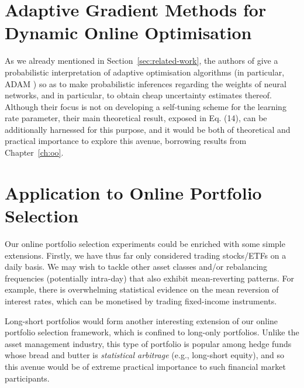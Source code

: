 \section{Adaptive Gradient Methods for Dynamic Online Optimisation}
\label{sec:oo-further-work}

\begin{mccorrection}
As we already mentioned in Section~\ref{sec:related-work}, the authors of \citep{badam} give a probabilistic interpretation of adaptive optimisation algorithms (in particular, ADAM \citep{adam}) so as to make probabilistic inferences regarding the weights of neural networks, and in particular, to obtain cheap uncertainty estimates thereof. Although their focus is not on developing a self-tuning scheme for the learning rate parameter, their main theoretical result, exposed in Eq. (14), can be additionally harnessed for this purpose, and it would be both of theoretical and practical importance to explore this avenue, borrowing results from Chapter~\ref{ch:oo}.
\end{mccorrection}


\section{Application to Online Portfolio Selection}

Our online portfolio selection experiments could be enriched with some simple extensions. Firstly, we have thus far only considered trading stocks/ETFs on a daily basis. We may wish to tackle other asset classes and/or rebalancing frequencies (potentially intra-day) that also exhibit mean-reverting patterns. For example, there is overwhelming statistical evidence on the mean reversion of interest rates, which can be monetised by trading fixed-income instruments.

Long-short portfolios would form another interesting extension of our online portfolio selection framework, which is confined to long-only portfolios. Unlike the asset management industry, this type of portfolio is popular among hedge funds whose bread and butter is \emph{statistical arbitrage} (e.g., long-short equity), and so this avenue would be of extreme practical importance to such financial market participants.